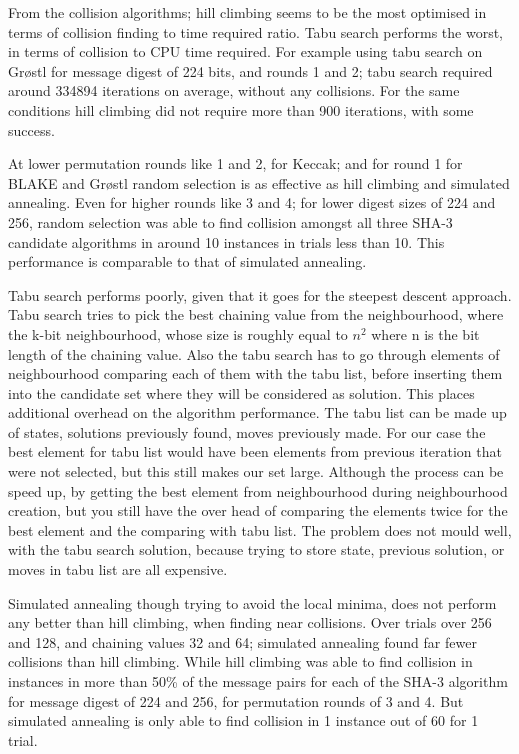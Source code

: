 From the collision algorithms; hill climbing seems to be the most optimised in terms of collision finding to time required
ratio. Tabu search performs the worst, in terms of collision to CPU time required. For example using tabu search on 
Gr{\o}stl for message digest of 224 bits, and rounds 1 and 2; tabu search required around 334894 iterations on average,
without any collisions. For the same conditions hill climbing did not require more than 900 iterations, with some success.

At lower permutation rounds like 1 and 2, for Keccak; and for round 1 for BLAKE and Gr{\o}stl random selection is as 
effective as hill climbing and simulated annealing. Even for higher rounds like 3 and 4; for lower digest sizes of 224
and 256, random selection was able to find collision amongst all three SHA-3 candidate algorithms in around 10 instances 
in trials less than 10. This performance is comparable to that of simulated annealing.

Tabu search performs poorly, given that it goes for the steepest descent approach. Tabu search tries to pick the best 
chaining value from the neighbourhood, where the k-bit neighbourhood, whose size is roughly equal to $n^{2}$ where n
is the bit length of the chaining value. Also the tabu search has to go through elements of neighbourhood comparing each
of them with the tabu list, before inserting them into the candidate set where they will be considered as solution.
This places additional overhead on the algorithm performance. The tabu list can be made up of states, solutions previously
found, moves previously made. For our case the best element for tabu list would have been elements from previous iteration
that were not selected, but this still makes our set large. Although the process can be speed up, by getting the best
element from neighbourhood during neighbourhood creation, but you still have the over head of comparing the elements
twice for the best element and the comparing with tabu list. The problem does not mould well, with the tabu search
solution, because trying to store state, previous solution, or moves in tabu list are all expensive.

Simulated annealing though trying to avoid the local minima, does not perform any better than hill climbing, when finding
near collisions. Over trials over 256 and 128, and chaining values 32 and 64; simulated annealing found far fewer collisions
than hill climbing. While hill climbing was able to find collision in instances in more than 50\% of the message
pairs for each of the SHA-3 algorithm for message digest of 224 and 256, for permutation rounds of 3 and 4. But 
simulated annealing is only able to find collision in 1 instance out of 60 for 1 trial.

